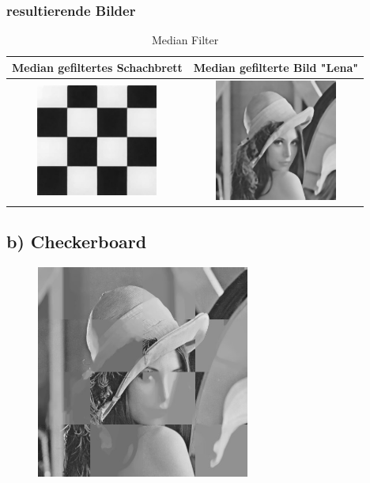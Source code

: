 \documentclass[12pt,german]{article}
\begin{document}
\subsubsection{resultierende Bilder}
\begin{table}[H]
  \centering
  \begin{tabular}{| c | c |}
    \hline
 	 Median gefiltertes Schachbrett & Median gefilterte Bild "Lena" \\
    \hline
	\includegraphics[width=4cm]{../testData/Median/SchachbrettR4.jpg} & 	\includegraphics[width=4cm]{../testData/Median/LenaMedian.jpg} \\
	\hline
  \end{tabular}
  \caption{Median Filter}
  \label{tab:MedianFilter}
\end{table}

\subsection{b) Checkerboard}
\begin{figure}[H]
	\includegraphics[width=7cm]{../testData/Median/4x4Lena.jpg}
\end{figure}
\end{document}
